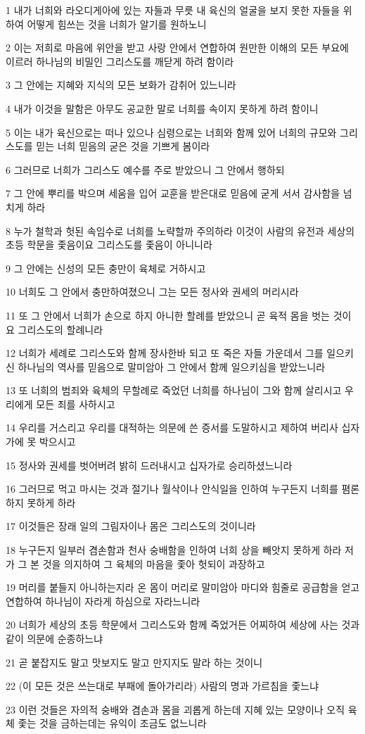 \par 1 내가 너희와 라오디게아에 있는 자들과 무릇 내 육신의 얼굴을 보지 못한 자들을 위하여 어떻게 힘쓰는 것을 너희가 알기를 원하노니
\par 2 이는 저희로 마음에 위안을 받고 사랑 안에서 연합하여 원만한 이해의 모든 부요에 이르러 하나님의 비밀인 그리스도를 깨닫게 하려 함이라
\par 3 그 안에는 지혜와 지식의 모든 보화가 감취어 있느니라
\par 4 내가 이것을 말함은 아무도 공교한 말로 너희를 속이지 못하게 하려 함이니
\par 5 이는 내가 육신으로는 떠나 있으나 심령으로는 너희와 함께 있어 너희의 규모와 그리스도를 믿는 너희 믿음의 굳은 것을 기쁘게 봄이라
\par 6 그러므로 너희가 그리스도 예수를 주로 받았으니 그 안에서 행하되
\par 7 그 안에 뿌리를 박으며 세움을 입어 교훈을 받은대로 믿음에 굳게 서서 감사함을 넘치게 하라
\par 8 누가 철학과 헛된 속임수로 너희를 노략할까 주의하라 이것이 사람의 유전과 세상의 초등 학문을 좇음이요 그리스도를 좇음이 아니니라
\par 9 그 안에는 신성의 모든 충만이 육체로 거하시고
\par 10 너희도 그 안에서 충만하여졌으니 그는 모든 정사와 권세의 머리시라
\par 11 또 그 안에서 너희가 손으로 하지 아니한 할례를 받았으니 곧 육적 몸을 벗는 것이요 그리스도의 할례니라
\par 12 너희가 세례로 그리스도와 함께 장사한바 되고 또 죽은 자들 가운데서 그를 일으키신 하나님의 역사를 믿음으로 말미암아 그 안에서 함께 일으키심을 받았느니라
\par 13 또 너희의 범죄와 육체의 무할례로 죽었던 너희를 하나님이 그와 함께 살리시고 우리에게 모든 죄를 사하시고
\par 14 우리를 거스리고 우리를 대적하는 의문에 쓴 증서를 도말하시고 제하여 버리사 십자가에 못 박으시고
\par 15 정사와 권세를 벗어버려 밝히 드러내시고 십자가로 승리하셨느니라
\par 16 그러므로 먹고 마시는 것과 절기나 월삭이나 안식일을 인하여 누구든지 너희를 폄론하지 못하게 하라
\par 17 이것들은 장래 일의 그림자이나 몸은 그리스도의 것이니라
\par 18 누구든지 일부러 겸손함과 천사 숭배함을 인하여 너희 상을 빼앗지 못하게 하라 저가 그 본 것을 의지하여 그 육체의 마음을 좇아 헛되이 과장하고
\par 19 머리를 붙들지 아니하는지라 온 몸이 머리로 말미암아 마디와 힘줄로 공급함을 얻고 연합하여 하나님이 자라게 하심으로 자라느니라
\par 20 너희가 세상의 초등 학문에서 그리스도와 함께 죽었거든 어찌하여 세상에 사는 것과 같이 의문에 순종하느냐
\par 21 곧 붙잡지도 말고 맛보지도 말고 만지지도 말라 하는 것이니
\par 22 (이 모든 것은 쓰는대로 부패에 돌아가리라) 사람의 명과 가르침을 좇느냐
\par 23 이런 것들은 자의적 숭배와 겸손과 몸을 괴롭게 하는데 지혜 있는 모양이나 오직 육체 좇는 것을 금하는데는 유익이 조금도 없느니라


